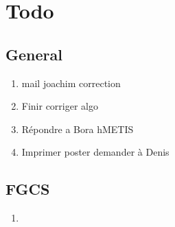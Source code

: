 \documentclass[a4paper]{article}
\begin{document}
\section{Todo}
	\subsection{General}
		\begin{enumerate}
			\item mail joachim correction
			\item Finir corriger algo
			\item Répondre a Bora hMETIS
			\item Imprimer poster demander à Denis
		\end{enumerate}
	\subsection{FGCS}
		\begin{enumerate}
			\item
		\end{enumerate}
\end{document}
